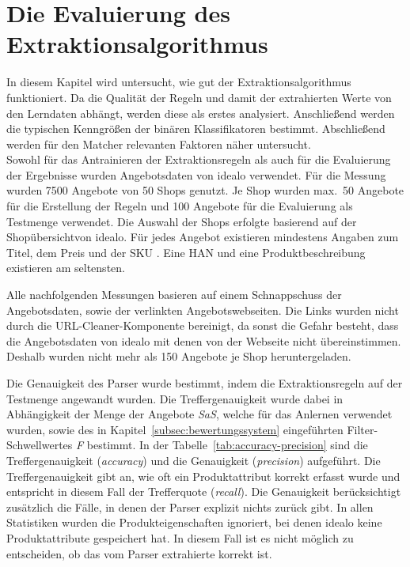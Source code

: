 \section{Die Evaluierung des Extraktionsalgorithmus}
\label{sec:evaluierung}

In diesem Kapitel wird untersucht, wie gut der Extraktionsalgorithmus funktioniert.
Da die Qualität der Regeln und damit der extrahierten Werte von den Lerndaten abhängt, werden diese als erstes
analysiert.
Anschließend werden die typischen Kenngrößen der binären Klassifikatoren bestimmt.
Abschließend werden für den Matcher relevanten Faktoren näher untersucht.\\
\newline
Sowohl für das Antrainieren der Extraktionsregeln als auch für die Evaluierung der Ergebnisse wurden Angebotsdaten
von idealo verwendet.
Für die Messung wurden 7500 Angebote von 50 Shops genutzt.
Je Shop wurden max.\ 50 Angebote für die Erstellung der Regeln und 100 Angebote für die Evaluierung als Testmenge
verwendet.
Die Auswahl der Shops erfolgte basierend auf der Shopübersicht\footnotemark von idealo.
Für jedes Angebot existieren mindestens Angaben zum Titel, dem Preis und der SKU .
Eine HAN und eine Produktbeschreibung existieren am seltensten.

Alle nachfolgenden Messungen basieren auf einem Schnappschuss der Angebotsdaten, sowie der verlinkten Angebotswebseiten.
Die Links wurden nicht durch die URL-Cleaner-Komponente bereinigt, da sonst die Gefahr besteht, dass die
Angebotsdaten von idealo mit denen von der Webseite nicht übereinstimmen.
Deshalb wurden nicht mehr als 150 Angebote je Shop heruntergeladen.

Die Genauigkeit des Parser wurde bestimmt, indem die Extraktionsregeln auf der Testmenge angewandt wurden.
Die Treffergenauigkeit wurde dabei in Abhängigkeit der Menge der Angebote \textit{SaS}, welche für das Anlernen
verwendet wurden, sowie des in Kapitel~\ref{subsec:bewertungssystem} eingeführten Filter-Schwellwertes \textit{F}
bestimmt.
In der Tabelle~\ref{tab:accuracy-precision} sind die Treffergenauigkeit (\textit{accuracy}) und die Genauigkeit
(\textit{precision}) aufgeführt.
Die Treffergenauigkeit gibt an, wie oft ein Produktattribut korrekt erfasst wurde und entspricht in diesem Fall der
Trefferquote (\textit{recall}).
Die Genauigkeit berücksichtigt zusätzlich die Fälle, in denen der Parser explizit nichts zurück gibt.
In allen Statistiken wurden die Produkteigenschaften ignoriert, bei denen idealo keine Produktattribute gespeichert hat.
In diesem Fall ist es nicht möglich zu entscheiden, ob das vom Parser extrahierte korrekt ist.

